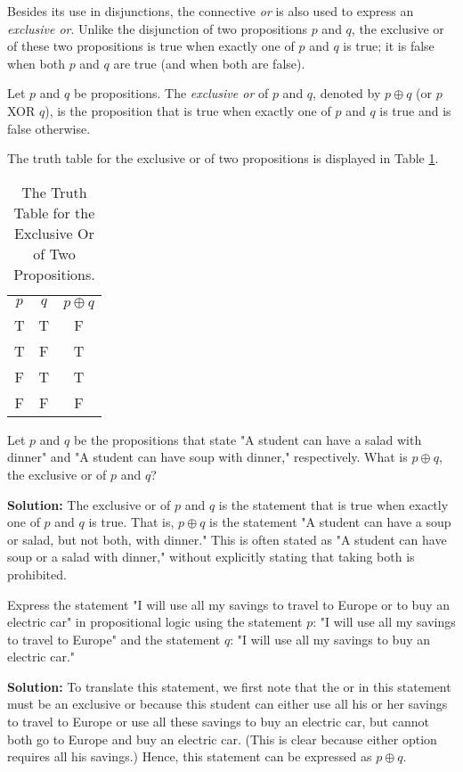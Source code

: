 \documentclass{Axon}
\begin{document}
Besides its use in disjunctions, the connective \textit{or} is also used to express an \textit{exclusive or}. Unlike the disjunction of two propositions \(p\) and \(q\), the exclusive or of these two propositions is true when exactly one of \(p\) and \(q\) is true; it is false when both \(p\) and \(q\) are true (and when both are false).

\begin{definition}
    Let \(p\) and \(q\) be propositions. The \textit{exclusive or} of \(p\) and \(q\), denoted by \(p \oplus q\) (or \(p\) XOR \(q\)), is the proposition that is true when exactly one of \(p\) and \(q\) is true and is false otherwise.
\end{definition}

The truth table for the exclusive or of two propositions is displayed in Table \ref{Table: 4}.

\begin{table}[h]
    \centering
    \begin{tabular}{c|c|c}
        \(p\) & \(q\) & \(p \oplus q\)\\
        T     & T     & F\\
        T     & F     & T\\
        F     & T     & T\\
        F     & F     & F
    \end{tabular}
    \caption{The Truth Table for the Exclusive Or of Two Propositions.}
    \label{Table: 4}
\end{table}

\begin{example}
    Let \(p\) and \(q\) be the propositions that state "A student can have a salad with dinner" and "A student can have soup with dinner," respectively. What is \(p \oplus q\), the exclusive or of \(p\) and \(q\)?

    \noindent
    \textbf{Solution:}
    The exclusive or of \(p\) and \(q\) is the statement that is true when exactly one of \(p\) and \(q\) is true. That is, \(p \oplus q\) is the statement "A student can have a soup or salad, but not both, with dinner." This is often stated as "A student can have soup or a salad with dinner," without explicitly stating that taking both is prohibited.
\end{example}

\begin{example}
    Express the statement "I will use all my savings to travel to Europe or to buy an electric car" in propositional logic using the statement \(p\): "I will use all my savings to travel to Europe" and the statement \(q\): "I will use all my savings to buy an electric car."

    \noindent
    \textbf{Solution:}
    To translate this statement, we first note that the or in this statement must be an exclusive or because this student can either use all his or her savings to travel to Europe or use all these savings to buy an electric car, but cannot both go to Europe and buy an electric car. (This is clear because either option requires all his savings.) Hence, this statement can be expressed as \(p \oplus q\).
\end{example}

\printbibliography
\end{document}
